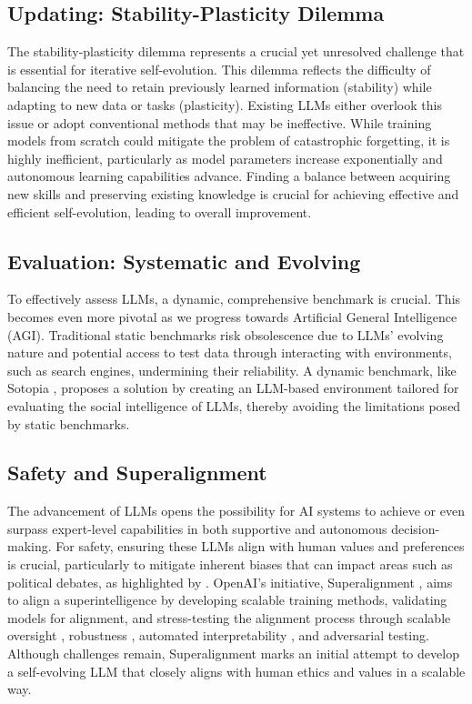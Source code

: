 \documentclass[sn-basic, Numbered]{sn-jnl}%
\theoremstyle{thmstyleone}%
\theoremstyle{thmstyletwo}%
\theoremstyle{thmstylethree}%
\begin{document}
\subsection{Updating: Stability-Plasticity Dilemma} 
The stability-plasticity dilemma represents a crucial yet unresolved challenge that is essential for iterative self-evolution. This dilemma reflects the difficulty of balancing the need to retain previously learned information (stability) while adapting to new data or tasks (plasticity). Existing LLMs either overlook this issue or adopt conventional methods that may be ineffective. While training models from scratch could mitigate the problem of catastrophic forgetting, it is highly inefficient, particularly as model parameters increase exponentially and autonomous learning capabilities advance. Finding a balance between acquiring new skills and preserving existing knowledge is crucial for achieving effective and efficient self-evolution, leading to overall improvement.

\subsection{Evaluation: Systematic and Evolving}
To effectively assess LLMs, a dynamic, comprehensive benchmark is crucial. This becomes even more pivotal as we progress towards Artificial General Intelligence (AGI). Traditional static benchmarks risk obsolescence due to LLMs' evolving nature and potential access to test data through interacting with environments, such as search engines, undermining their reliability. A dynamic benchmark, like Sotopia \cite{zhou2023sotopia}, proposes a solution by creating an LLM-based environment tailored for evaluating the social intelligence of LLMs, thereby avoiding the limitations posed by static benchmarks.

\subsection{Safety and Superalignment}
The advancement of LLMs opens the possibility for AI systems to achieve or even surpass expert-level capabilities in both supportive and autonomous decision-making. For safety, ensuring these LLMs align with human values and preferences is crucial, particularly to mitigate inherent biases that can impact areas such as political debates, as highlighted by \citet{taubenfeld2024systematic}.  OpenAI's initiative, Superalignment \cite{superalignment2023}, aims to align a superintelligence by developing scalable training methods, validating models for alignment, and stress-testing the alignment process through scalable oversight \cite{saunders2022self}, robustness \cite{perez2022red}, automated interpretability \cite{bills2023language}, and adversarial testing. Although challenges remain, Superalignment marks an initial attempt to develop a self-evolving LLM that closely aligns with human ethics and values in a scalable way.
\end{document}
